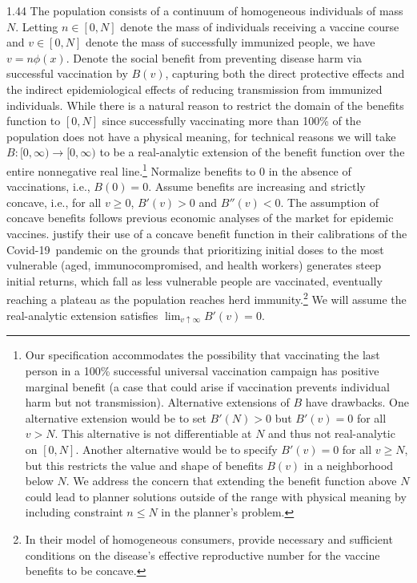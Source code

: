 \documentclass[12pt]{article}
\newcommand{\efficacy}{\phi}
\newcommand{\benefit}{B}
\newcommand{\covid}{Covid-19}
\begin{document}
\begin{spacing}{1.44}
The population consists of a continuum of homogeneous individuals of
mass $N$. Letting $n \in [0,N]$ denote the mass of individuals
receiving a vaccine course and $v \in [0,N]$ denote the mass of
successfully immunized people, we have $v = n \efficacy(x)$. Denote
the social benefit from preventing disease harm via successful
vaccination by $B(v)$, capturing both the direct protective effects
and the indirect epidemiological effects of reducing transmission from
immunized individuals. While there is a natural reason to restrict the
domain of the benefits function to $[0,N]$ since successfully
vaccinating more than 100\% of the population does not have a physical
meaning, for technical reasons we will take $B : [0, \infty)
  \rightarrow [0,\infty)$ to be a real-analytic extension of the
    benefit function over the entire nonnegative real
    line.\footnote{Our specification accommodates the possibility that
    vaccinating the last person in a 100\% successful universal
    vaccination campaign has positive marginal benefit (a case that
    could arise if vaccination prevents individual harm but not
    transmission). Alternative extensions of $B$ have drawbacks. One
    alternative extension would be to set $B'(N) > 0$ but $B'(v) = 0$
    for all $v > N$. This alternative is not differentiable at $N$ and
    thus not real-analytic on $[0, N]$. Another alternative would be
    to specify $B'(v) = 0$ for all $v \geq N$, but this restricts the
    value and shape of benefits $B(v)$ in a neighborhood below $N$. We
    address the concern that extending the benefit function above $N$
    could lead to planner solutions outside of the range with physical
    meaning by including constraint $n \leq N$ in the planner's
    problem.} Normalize benefits to 0 in the absence of vaccinations,
    i.e., $\benefit(0) = 0$. Assume benefits are increasing and
    strictly concave, i.e., for all $v \geq 0$, $\benefit'(v) > 0$ and
    $\benefit''(v) < 0$. The assumption of concave benefits follows
    previous economic analyses of the market for epidemic
    vaccines. \citet{Ahuja2021} justify their use of a concave benefit
    function in their calibrations of the \covid\ pandemic on the
    grounds that prioritizing initial doses to the most vulnerable
    (aged, immunocompromised, and health workers) generates steep
    initial returns, which fall as less vulnerable people are
    vaccinated, eventually reaching a plateau as the population
    reaches herd immunity.\footnote{In their model of homogeneous
    consumers, \citet[][Proposition~7]{Goodkin-Gold2024} provide
    necessary and sufficient conditions on the disease's effective
    reproductive number for the vaccine benefits to be concave.} We
    will assume the real-analytic extension satisfies $\lim_{v
      \uparrow \infty} B'(v) = 0$.


\end{spacing}
\end{document}
